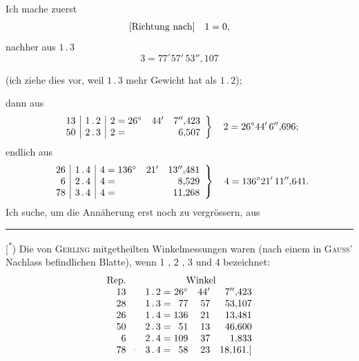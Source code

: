 Ich mache zuerst
\[
\begin{array}{r@{\quad}r@{\;}c@{\;}l}
\text{[Richtung nach]}&1&=&0,
\end{array}
\]
\noindent nachher aus $1\,.\,3$
\[
3=77^\circ57'\,53''{,}107
\]
\begin{center}(ich ziehe dies vor, weil $1\,.\,3$ mehr Gewicht hat als $1\,.\,2$);\end{center}
\noindent dann aus
\[
\left.\begin{array}{r|c|r@{\;}c@{\;}rrr}
13&1\,.\,2&2&=&26^\circ&44'&7''{,}423\\
50&2\,.\,3&2&=&&&6{,}507
\end{array}\right\}\quad2=26^\circ44'\,6''{,}696;
\]
\noindent endlich aus
\[
\left.\begin{array}{r|c|r@{\;}c@{\;}rrr}
26&1\,.\,4&4&=&136^\circ&21'&13''{,}481\\
6&2\,.\,4&4&=&&&8{,}529\\
78&3\,.\,4&4&=&&&11{,}268
\end{array}\right\}\quad4=136^\circ21'\,11''{,}641.
\]
Ich suche, um die Annäherung erst noch zu vergrössern, aus

\vfill\noindent\rule{4cm}{.4pt}\par\smallskip
{\footnotesize
[\textsuperscript{*}) Die von \textsc{Gerling} mitgetheilten Winkelmessungen waren (nach einem in \textsc{Gauss}' Nachlass befindlichen Blatte), wenn 1 , 2 , 3  und 4  bezeichnet:
\[
\begin{array}{r@{\qquad}c@{\;}c@{\;}rrr}
\text{Rep.}&\multicolumn{5}{c}{\text{Winkel}}\\
13&1\,.\,2&=&26^\circ&44'&7''{,}423\\
28&1\,.\,3&=&77&57&53{,}107\\
26&1\,.\,4&=&136&21&13{,}481\\
50&2\,.\,3&=&51&13&46{,}600\\
6&2\,.\,4&=&109&37&1{,}833\\
78\rlap{\hspace{.8em}\raisebox{.7ex}{\tiny.}}&3\,.\,4&=&58&23&18{,}161.\text{]}
\end{array}
\]
}

